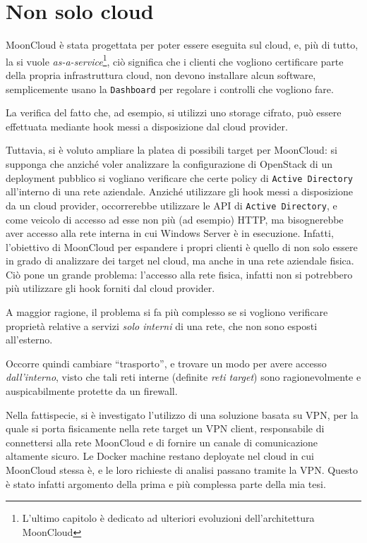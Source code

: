 \section{Non solo cloud}\label{sec:mooncloud-not-only-cloud}
MoonCloud è stata progettata per poter essere eseguita sul cloud, e, più di tutto,
la si vuole \textit{as-a-service}\footnote{L'ultimo capitolo è dedicato ad ulteriori
evoluzioni dell'architettura MoonCloud}, ciò significa che i clienti che vogliono
certificare parte della propria infrastruttura cloud, non devono installare alcun
software, semplicemente usano la \texttt{Dashboard} per regolare i controlli
che vogliono fare.

La verifica del fatto che, ad esempio, si utilizzi uno storage cifrato, può essere
effettuata mediante hook messi a disposizione dal cloud provider.

Tuttavia, si è voluto ampliare la platea di possibili target per MoonCloud:
si supponga che anziché voler analizzare la configurazione di OpenStack di
un deployment pubblico si vogliano verificare che certe policy di \texttt{Active
Directory} all'interno di una rete aziendale.
Anziché utilizzare gli hook messi a disposizione da un cloud provider, occorrerebbe
utilizzare le API di \texttt{Active Directory}, e come veicolo di accesso ad esse
non più (ad esempio) HTTP, ma bisognerebbe aver accesso alla rete interna
in cui Windows Server è in esecuzione.
Infatti, l'obiettivo di MoonCloud per espandere i propri clienti è quello di non
solo essere in grado di analizzare dei target nel cloud, ma anche in una rete
aziendale fisica.
Ciò pone un grande problema: l'accesso alla rete fisica, infatti non si potrebbero
più utilizzare gli hook forniti dal cloud provider.

A maggior ragione, il problema si fa più complesso se si vogliono verificare
proprietà relative a servizi \textit{solo interni} di una rete, che non sono
esposti all'esterno.

Occorre quindi cambiare ``trasporto'', e trovare un modo per avere accesso
\textit{dall'interno}, visto che tali reti interne (definite \textit{reti target})
sono ragionevolmente e auspicabilmente protette da un firewall.

Nella fattispecie, si è investigato l'utilizzo di una soluzione basata su VPN,
per la quale si porta fisicamente nella rete target un VPN client, responsabile
di connettersi alla rete MoonCloud e di fornire un canale di comunicazione
altamente sicuro.
Le Docker machine restano deployate nel cloud in cui MoonCloud stessa è, e le
loro richieste di analisi passano tramite la VPN.
Questo è stato infatti argomento della prima e più complessa parte della mia tesi.

